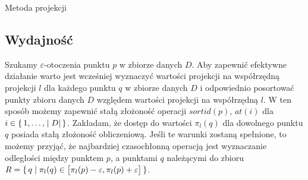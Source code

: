 \begin{algorithm}[t]
	\caption{Metoda projekcji}\label{alg:projection}
	
	\DontPrintSemicolon
	
	
	\setcounter{AlgoLine}{0}
	\nonl{}
	\setcounter{AlgoLine}{0}
	\nonl{}
	
	\setcounter{AlgoLine}{0}
	\nonl{}
	\nonl{}
\end{algorithm}

\subsection{Wydajność}
Szukamy $ \varepsilon $-otoczenia punktu $ p $ w zbiorze danych $ D $. Aby zapewnić efektywne działanie  warto jest wcześniej wyznaczyć wartości projekcji na współrzędną projekcji $ l $ dla każdego punktu $ q $ w zbiorze danych $ D $ i odpowiednio posortować punkty zbioru danych $ D $ względem wartości projekcji na współrzędną $ l $. W ten sposób możemy zapewnić stałą złożoność operacji $ sortid(p) $, $ at(i) $ dla $ i \in \set{1,\dots,|D|} $. Zakładam, że dostęp do wartości $ \pi_l(q) $ dla dowolnego punktu $ q $ posiada stałą złożoność obliczeniową. Jeśli te warunki zostaną spełnione, to możemy przyjąć, że najbardziej czasochłonną operacją  jest wyznaczanie odległości między punktem $ p $, a punktami $ q $ należącymi do zbioru \mbox{$ R = \set{q | \pi_l(q) \in \left[\pi_l(p)-\varepsilon,\pi_l(p)+\varepsilon\right]} $}.

